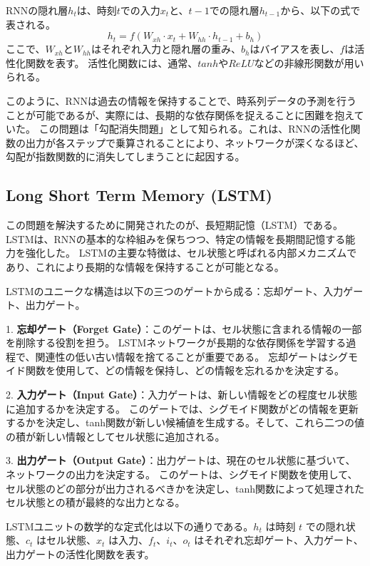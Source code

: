     RNNの隠れ層\( h_t \)は、時刻\( t \)での入力\( x_t \)と、\( t-1 \)での隠れ層\( h_{t-1} \)から、以下の式で表される。
    \begin{equation}
      h_t = f(W_{xh} \cdot x_t + W_{hh} \cdot h_{t-1} + b_h)
    \end{equation}
    ここで、\( W_{xh} \)と\( W_{hh} \)はそれぞれ入力と隠れ層の重み、\( b_h \)はバイアスを表し、\( f \)は活性化関数を表す。
    活性化関数には、通常、\( tanh \)や\( ReLU \)などの非線形関数が用いられる。

    このように、RNNは過去の情報を保持することで、時系列データの予測を行うことが可能であるが、実際には、長期的な依存関係を捉えることに困難を抱えていた。
    この問題は「勾配消失問題」として知られる。これは、RNNの活性化関数の出力が各ステップで乗算されることにより、ネットワークが深くなるほど、勾配が指数関数的に消失してしまうことに起因する。
    
    \subsection{Long Short Term Memory (LSTM)}
    この問題を解決するために開発されたのが、長短期記憶（LSTM）である。
    LSTMは、RNNの基本的な枠組みを保ちつつ、特定の情報を長期間記憶する能力を強化した。
    LSTMの主要な特徴は、セル状態と呼ばれる内部メカニズムであり、これにより長期的な情報を保持することが可能となる。
    
    LSTMのユニークな構造は以下の三つのゲートから成る：忘却ゲート、入力ゲート、出力ゲート。
    
    1. \textbf{忘却ゲート（Forget Gate）}：このゲートは、セル状態に含まれる情報の一部を削除する役割を担う。
    LSTMネットワークが長期的な依存関係を学習する過程で、関連性の低い古い情報を捨てることが重要である。
    忘却ゲートはシグモイド関数を使用して、どの情報を保持し、どの情報を忘れるかを決定する。
   
    2. \textbf{入力ゲート（Input Gate）}：入力ゲートは、新しい情報をどの程度セル状態に追加するかを決定する。
    このゲートでは、シグモイド関数がどの情報を更新するかを決定し、tanh関数が新しい候補値を生成する。そして、これら二つの値の積が新しい情報としてセル状態に追加される。
    
    3. \textbf{出力ゲート（Output Gate）}：出力ゲートは、現在のセル状態に基づいて、ネットワークの出力を決定する。
    このゲートは、シグモイド関数を使用して、セル状態のどの部分が出力されるべきかを決定し、tanh関数によって処理されたセル状態との積が最終的な出力となる。
    
    LSTMユニットの数学的な定式化は以下の通りである。\( h_t \) は時刻 \( t \) での隠れ状態、\( c_t \) はセル状態、\( x_t \) は入力、\( f_t \)、\( i_t \)、\( o_t \) はそれぞれ忘却ゲート、入力ゲート、出力ゲートの活性化関数を表す。
    
